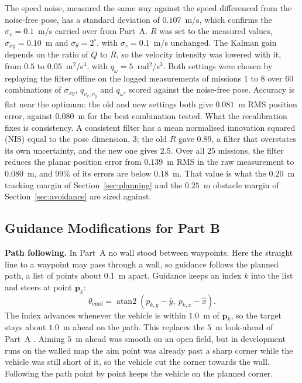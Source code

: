 The speed noise, measured the same way against the speed differenced
from the noise-free pose, has a standard deviation of $0.107$~m/s,
which confirms the $\sigma_{v} = 0.1$~m/s carried over from Part~A.
$R$ was set to the measured values, $\sigma_{xy} = 0.10$~m and
$\sigma_{\theta} = 2^{\circ}$, with $\sigma_{v} = 0.1$~m/s unchanged.
The Kalman gain depends on the ratio of $Q$ to $R$, so the velocity
intensity was lowered with it, from $0.5$ to $0.05$~m$^{2}$/s$^{3}$, with
$q_{\omega} = 5$~rad$^{2}$/s$^{3}$. Both settings were chosen by
replaying the filter offline on the logged measurements of missions
$1$ to $8$ over $60$ combinations of $\sigma_{xy}$, $q_{v_{x}, v_{y}}$
and $q_{\omega}$, scored against the noise-free pose. Accuracy is flat
near the optimum: the old and new settings both give $0.081$~m RMS
position error, against $0.080$~m for the best combination tested. What
the recalibration fixes is consistency. A consistent filter has a mean
normalised innovation squared (NIS) \cite{urrea2021} equal to the pose dimension, $3$;
the old $R$ gave $0.89$, a filter that overstates its own uncertainty,
and the new one gives $2.5$. Over all $25$ missions, the filter reduces the planar position error
from $0.139$~m RMS in the raw measurement to $0.080$~m, and $99$\% of
its errors are below $0.18$~m. That value is what the $0.20$~m tracking
margin of Section~\ref{sec:planning} and the $0.25$~m obstacle margin of
Section~\ref{sec:avoidance} are sized against.

\subsection{Guidance Modifications for Part B}
\textbf{Path following.} In Part~A no wall stood between waypoints.
Here the straight line to a waypoint may pass through a wall, so
guidance follows the planned path, a list of points about $0.1$~m
apart. Guidance keeps an index $k$ into the list and steers at point
$\mathbf{p}_{k}$:
\begin{equation}
    \theta_{\text{cmd}} = \operatorname{atan2}\!\left(p_{k,y} - \hat{y},\ p_{k,x} - \hat{x}\right).
    \label{eq:guidance}
\end{equation}
The index advances whenever the vehicle is within $1.0$~m of
$\mathbf{p}_{k}$, so the target stays about $1.0$~m ahead on the path.
This replaces the $5$~m look-ahead of Part~A \cite{partA_est}. Aiming
$5$~m ahead was smooth on an open field, but in development runs on the
walled map the aim point was already past a sharp corner while the
vehicle was still short of it, so the vehicle cut the corner towards
the wall. Following the path
point by point keeps the vehicle on the planned corner.

